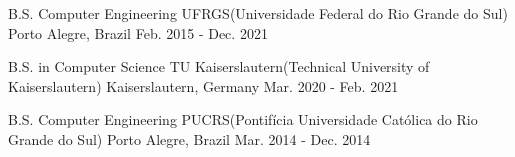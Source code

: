 
\begin{cventries}
    \cvcompactentry
    {B.S. Computer Engineering} %
    {UFRGS(Universidade Federal do Rio Grande do Sul)} %
    {Porto Alegre, Brazil} %
    {Feb. 2015 - Dec. 2021} %

    \cvcompactentry
    {B.S. in Computer Science} %
    {TU Kaiserslautern(Technical University of Kaiserslautern)} %
    {Kaiserslautern, Germany} %
    {Mar. 2020 - Feb. 2021} %

    \cvcompactentry
    {B.S. Computer Engineering} %
    {PUCRS(Pontifícia Universidade Católica do Rio Grande do Sul)} %
    {Porto Alegre, Brazil} %
    {Mar. 2014 - Dec. 2014} %
\end{cventries}
